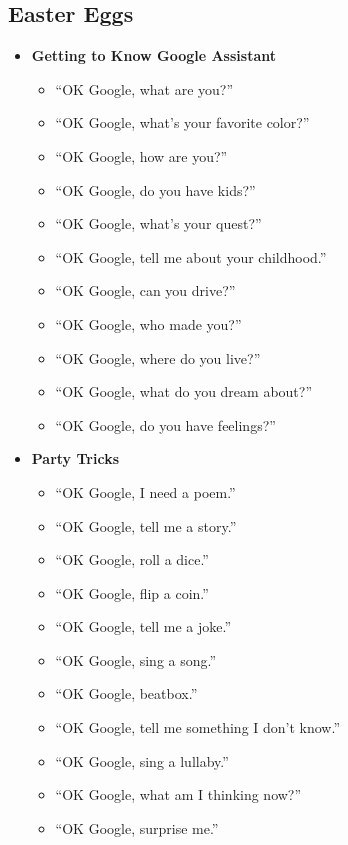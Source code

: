 \documentclass[
  jou,
  floatsintext,
  longtable,
  a4paper,
  nolmodern,
  notxfonts,
  notimes,
  12pt,
  colorlinks=true,linkcolor=blue,citecolor=blue,urlcolor=blue]{apa7}
\providecommand{\tightlist}{%
  \setlength{\itemsep}{0pt}\setlength{\parskip}{0pt}}
\begin{document}
\subsection{Easter Eggs}\label{easter-eggs}

\begin{itemize}
\tightlist
\item
  \textbf{Getting to Know Google Assistant}

  \begin{itemize}
  \tightlist
  \item
    ``OK Google, what are you?''
  \item
    ``OK Google, what's your favorite color?''
  \item
    ``OK Google, how are you?''
  \item
    ``OK Google, do you have kids?''
  \item
    ``OK Google, what's your quest?''
  \item
    ``OK Google, tell me about your childhood.''
  \item
    ``OK Google, can you drive?''
  \item
    ``OK Google, who made you?''
  \item
    ``OK Google, where do you live?''
  \item
    ``OK Google, what do you dream about?''
  \item
    ``OK Google, do you have feelings?''
  \end{itemize}
\item
  \textbf{Party Tricks}

  \begin{itemize}
  \tightlist
  \item
    ``OK Google, I need a poem.''
  \item
    ``OK Google, tell me a story.''
  \item
    ``OK Google, roll a dice.''
  \item
    ``OK Google, flip a coin.''
  \item
    ``OK Google, tell me a joke.''
  \item
    ``OK Google, sing a song.''
  \item
    ``OK Google, beatbox.''
  \item
    ``OK Google, tell me something I don't know.''
  \item
    ``OK Google, sing a lullaby.''
  \item
    ``OK Google, what am I thinking now?''
  \item
    ``OK Google, surprise me.''
  \end{itemize}
\end{itemize}
\end{document}
